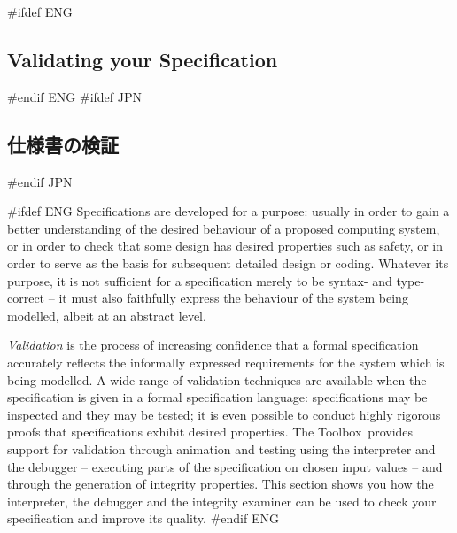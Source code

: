 \documentclass[\pformat,12pt]{article}
\newcommand{\Toolbox}{Toolbox}
\newcommand{\Toolbox}{Toolbox}
\newcommand{\guicmd}[1]{{\sf #1}}
\newcommand{\guicmd}[1]{{\gt #1}}
\begin{document}



#ifdef ENG
\subsection{Validating your Specification}
#endif ENG
#ifdef JPN
\subsection{仕様書の検証}
#endif JPN

#ifdef ENG
Specifications are developed for a purpose: usually in order to gain a
better understanding of the desired behaviour of a proposed computing
system, or in order to check that some design has desired properties
such as safety, or in order to serve as the basis for subsequent
detailed design or coding. Whatever its purpose, it is not sufficient
for a specification merely to be syntax- and type-correct -- it must
also faithfully express the behaviour of the system being modelled,
albeit at an abstract level.

{\em Validation\/} is the process of increasing confidence that a
formal specification accurately reflects the informally expressed
requirements for the system which is being modelled. A wide range of
validation 
techniques are available when the specification is given in a formal
specification language: specifications may be inspected and they may
be tested; it is even possible to conduct highly rigorous proofs that
specifications exhibit desired properties. The \Toolbox\ provides
support for validation through animation and testing using the
interpreter and the debugger -- executing parts
of the specification on chosen input values -- and through the
generation of integrity properties. This section shows you
how the interpreter, the debugger and the integrity examiner can be
used to check your specification and improve its quality.
#endif ENG
\end{document}
